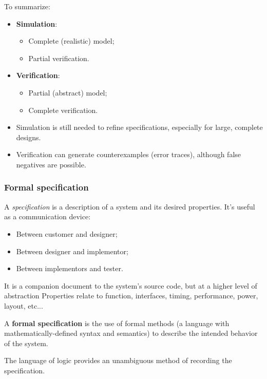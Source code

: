 \documentclass[a4paper,11pt]{article}
\begin{document}
To summarize:

\begin{itemize}
    \item \textbf{Simulation}:
    \begin{itemize}
        \item Complete (realistic) model;
        \item Partial verification.
    \end{itemize}

    \item \textbf{Verification}:
    \begin{itemize}
        \item Partial (abstract) model;
        \item Complete verification.
    \end{itemize}
\end{itemize}

\begin{itemize}
    \item Simulation is still needed to refine specifications, especially for large, complete designs.
    \item Verification can generate counterexamples (error traces), although false negatives are possible.
\end{itemize}

\subsubsection{Formal specification}

A \textit{specification} is a description of a system and its desired properties.
It's useful as a communication device:
\begin{itemize}
\item Between customer and designer;
\item Between designer and implementor;
\item Between implementors and tester.
\end{itemize}
It is a companion document to the system’s source code, but at a
higher level of abstraction
Properties relate to function, interfaces, timing, performance,
power, layout, etc...

A \textbf{formal specification} is the use of formal methods (a language with
mathematically-defined syntax and semantics) to describe the
intended behavior of the system.

The language of logic provides an unambiguous method of recording
the specification.
\end{document}
